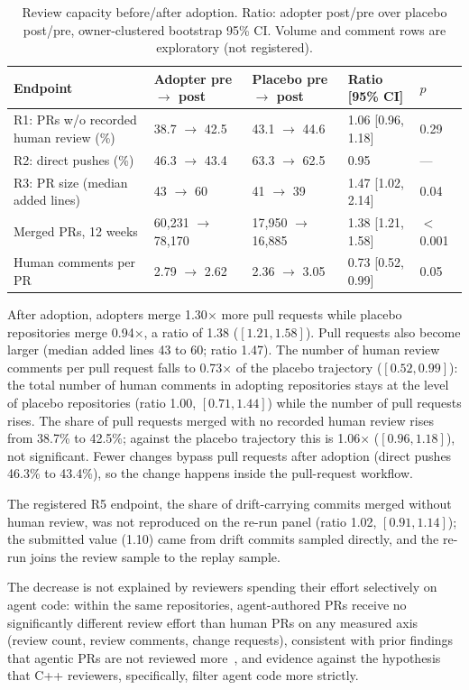 \documentclass[sigplan,11pt,nonacm=true]{acmart}
\newcommand{\x}{$\times$}
\begin{document}
\begin{table}[t]
\caption{Review capacity before/after adoption. Ratio: adopter post/pre over
placebo post/pre, owner-clustered bootstrap 95\% CI. Volume and comment rows
are exploratory (not registered).}
\label{tab:review}
\small
\begin{tabular}{@{}lllll@{}}
\toprule
Endpoint & Adopter pre $\to$ post & Placebo pre $\to$ post & Ratio [95\% CI] & $p$ \\
\midrule
R1: PRs w/o recorded human review (\%) & 38.7 $\to$ 42.5 & 43.1 $\to$ 44.6 & 1.06 [0.96, 1.18] & 0.29 \\
R2: direct pushes (\%)                  & 46.3 $\to$ 43.4 & 63.3 $\to$ 62.5 & 0.95 & --- \\
R3: PR size (median added lines)        & 43 $\to$ 60     & 41 $\to$ 39     & 1.47 [1.02, 2.14] & 0.04 \\
Merged PRs, 12 weeks                    & 60{,}231 $\to$ 78{,}170 & 17{,}950 $\to$ 16{,}885 & 1.38 [1.21, 1.58] & $<$0.001 \\
Human comments per PR                   & 2.79 $\to$ 2.62 & 2.36 $\to$ 3.05 & 0.73 [0.52, 0.99] & 0.05 \\
\bottomrule
\end{tabular}
\end{table}

After adoption, adopters merge 1.30\x{} more pull requests while placebo
repositories merge 0.94\x{}, a ratio of 1.38 ($[1.21, 1.58]$). Pull requests
also become larger (median added lines 43 to 60; ratio 1.47). The number of
human review comments per pull request falls to 0.73\x{} of the placebo
trajectory ($[0.52, 0.99]$): the total number of human comments in adopting
repositories stays at the level of placebo repositories (ratio 1.00,
$[0.71, 1.44]$) while the number of pull requests rises. The share of pull
requests merged with no recorded human review rises from 38.7\% to 42.5\%;
against the placebo trajectory this is 1.06\x{} ($[0.96, 1.18]$), not
significant. Fewer changes bypass pull requests after adoption (direct pushes
46.3\% to 43.4\%), so the change happens inside the pull-request workflow.

The registered R5 endpoint, the share of drift-carrying commits merged without
human review, was not reproduced on the re-run panel (ratio 1.02,
$[0.91, 1.14]$); the submitted value (1.10) came from drift commits sampled
directly, and the re-run joins the review sample to the replay sample.

The decrease is not explained by reviewers spending their effort selectively on
agent code: within the same
repositories, agent-authored PRs receive no significantly different review
effort than human PRs on any measured axis (review count, review comments,
change requests), consistent with prior findings that agentic PRs are not
reviewed more~\cite{duma2026reviews}, and evidence against the hypothesis that
C++ reviewers, specifically, filter agent code more strictly.
\end{document}
